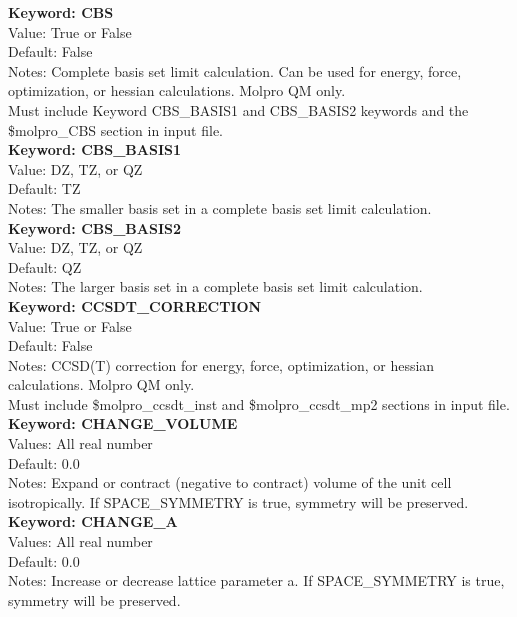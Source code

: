 \documentclass[11pt,letterpaper]{article}
\begin{document}
\begin{spacing}{1.0}
\noindent
\textbf{Keyword: CBS}\\
Value: True or False\\
Default: False\\
Notes:   Complete basis set limit calculation. Can be used for energy, force, optimization, or hessian calculations. Molpro QM only.\\
Must include Keyword CBS\_BASIS1 and CBS\_BASIS2 keywords and the \$molpro\_CBS section in input file.\\

\noindent
\textbf{Keyword: CBS\_BASIS1}\\
Value: DZ, TZ, or QZ \\
Default: TZ\\
Notes: The smaller basis set in a complete basis set limit calculation.\\



\noindent
\textbf{Keyword: CBS\_BASIS2}\\
Value: DZ, TZ, or QZ \\
Default: QZ\\
Notes: The larger basis set in a complete basis set limit calculation.\\

\noindent
\textbf{Keyword: CCSDT\_CORRECTION}\\
Value: True or False\\
Default: False\\
Notes: CCSD(T) correction for energy, force, optimization, or hessian calculations. Molpro QM only.\\
Must include \$molpro\_ccsdt\_inst and \$molpro\_ccsdt\_mp2 sections in input file.%
\\


\noindent
\textbf{Keyword: CHANGE\_VOLUME} \\
Values:  All real number \\
Default: 0.0 \\
Notes:   Expand or contract (negative to contract) volume of the unit cell isotropically. If SPACE\_SYMMETRY is true, symmetry will be preserved.\\

\noindent
\textbf{Keyword: CHANGE\_A} \\
Values:  All real number \\
Default: 0.0 \\
Notes:  Increase or decrease lattice parameter a. If SPACE\_SYMMETRY is
              true, symmetry will be preserved.\\


\end{spacing}
\end{document}
